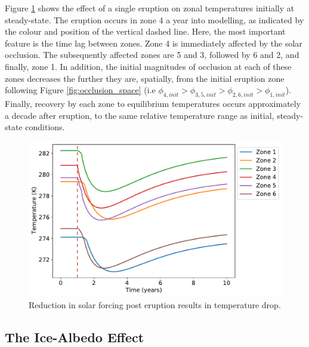 \documentclass[12pt]{article}
\begin{document}
Figure \ref{fig:oneerupt} shows the effect of a single eruption on zonal 
temperatures initially at steady-state. The eruption occurs in zone 4 a year into
modelling, as indicated by the colour and position of the vertical dashed line. 
Here, the most important feature is the time lag between zones. Zone 4 is immediately 
affected by the solar occlusion. The subsequently affected zones are 5 and 3, followed 
by 6 and 2, and finally, zone 1. In addition, the initial magnitudes of occlusion 
at each of these zones decreases the further they are, spatially, from the 
initial eruption zone following Figure \ref{fig:occlusion_space}
(i.e $\phi_{4,init} > \phi_{3,5,init} > \phi_{2,6,init} > \phi_{1,init}$).
Finally, recovery by each zone to equilibrium temperatures occurs approximately 
a decade after eruption, to the same relative temperature range as initial, 
steady-state conditions.

\begin{figure}[H]
    \centering
    \includegraphics[scale=0.6]{one_eruption.pdf}
    \caption{
        Reduction in solar forcing post eruption results in temperature drop.
    }
    \label{fig:oneerupt}
\end{figure}
\FloatBarrier

\subsection{The Ice-Albedo Effect}
\end{document}
